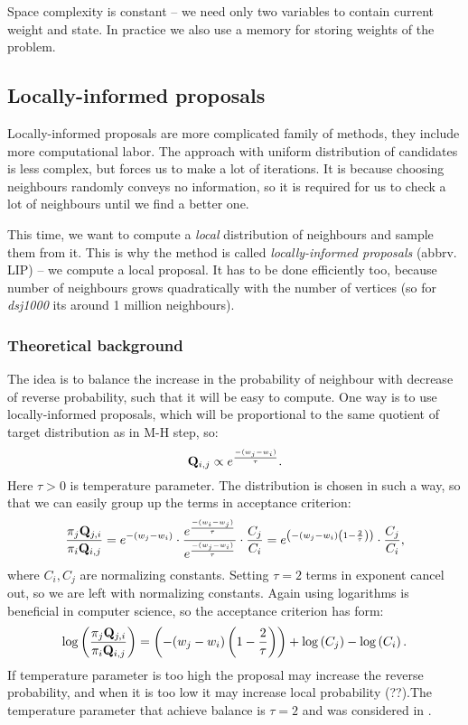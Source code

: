 		Space complexity is constant -- we need only two variables to contain current weight and state. In practice we also use a memory for storing weights of the problem.

\subsection{Locally-informed proposals}
	Locally-informed proposals are more complicated family of methods, they include more computational labor. The approach with uniform distribution of candidates is less complex, but forces us to make a lot of iterations. It is because choosing neighbours randomly conveys no information, so it is required for us to check a lot of neighbours until we find a better one. 
	
	This time, we want to compute a \textit{local} distribution of neighbours and sample them from it. This is why the method is called \textit{locally-informed proposals} (abbrv. LIP) -- we compute a local proposal. It has to be done efficiently too, because number of neighbours grows quadratically with the number of vertices (so for \textit{dsj1000} its around 1 million neighbours).
	
	\subsubsection{Theoretical background}
		The idea is to balance the increase in the probability of neighbour with decrease of reverse probability, such that it will be easy to compute. One way is to use locally-informed proposals, which will be proportional to the same quotient of target distribution as in M-H step, so:
		\begin{equation*}
			\mathbf{Q}_{i,j} \propto e^\frac{-(w_{j} - w_i)}{\tau}.
		\end{equation*}
		Here $\tau>0$ is temperature parameter. The distribution is chosen in such a way, so that we can easily group up the terms in acceptance criterion:
		\begin{equation*}
			\frac{\pi_j \mathbf{Q}_{j,i}}{\pi_i \mathbf{Q}_{i,j}} = e^{-(w_j-w_i)} \cdot \frac{e^\frac{-(w_{i} - w_j)}{\tau}}{e^\frac{-(w_{j} - w_i)}{\tau}} \cdot \frac{C_j}{C_i} = e^{\left( -(w_j-w_i) \left(1 - \frac{2}{\tau}\right) \right)} \cdot \frac{C_j}{C_i},
		\end{equation*}
		where $C_i, C_j$ are normalizing constants. Setting $\tau=2$ terms in exponent cancel out, so we are left with normalizing constants. Again using logarithms is beneficial in computer science, so the acceptance criterion has form:
		\begin{equation*}
			\log\left(\frac{\pi_j \mathbf{Q}_{j,i}}{\pi_i \mathbf{Q}_{i,j}}\right) = \left( -(w_j-w_i) \left(1 - \frac{2}{\tau}\right) \right) + \log\left(C_j\right) - \log\left(C_i\right).
		\end{equation*}
		If temperature parameter is too high the proposal may increase the reverse probability, and when it is too low it may increase local probability (??).The temperature parameter that achieve balance is $\tau=2$ and was considered in \cite{zanella2020informed}.
	
